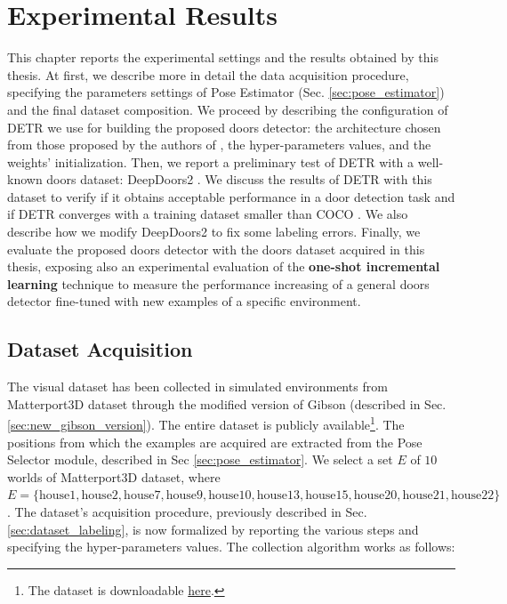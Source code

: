 \chapter{Experimental Results}
\label{sec:chapter5}
\thispagestyle{empty}

This chapter reports the experimental settings and the results obtained by this thesis. At first, we describe more in detail the data acquisition procedure, specifying the parameters settings of Pose Estimator (Sec. \ref{sec:pose_estimator}) and the final dataset composition. We proceed by describing the configuration of DETR we use for building the proposed doors detector: the architecture chosen from those proposed by the authors of \cite{detr}, the hyper-parameters values, and the weights' initialization. Then, we report a preliminary test of DETR with a well-known doors dataset: DeepDoors2 \cite{deepdoors2}. We discuss the results of DETR with this dataset to verify if it obtains acceptable performance in a door detection task and if DETR converges with a training dataset smaller than COCO \cite{coco}. We also describe how we modify DeepDoors2  to fix some labeling errors. Finally, we evaluate the proposed doors detector with the doors dataset acquired in this thesis, exposing also an experimental evaluation of the \textbf{one-shot incremental learning} technique to measure the performance increasing of a general doors detector fine-tuned with new examples of a specific environment. 

\section{Dataset Acquisition}
\label{sec:dataset_acquisition}
The visual dataset has been collected in simulated environments from Matterport3D dataset \cite{matterport} through the modified version of Gibson \cite{gibson} (described in Sec. \ref{sec:new_gibson_version}). The entire dataset is publicly available\footnote{The dataset is downloadable \href{https://drive.google.com/file/d/1BqjBpobjKTomFjDkzhWjmCryAXOEluO2/view?usp=sharing}{here}.}. The positions from which the examples are acquired are extracted from the Pose Selector module, described in Sec \ref{sec:pose_estimator}. We select a set $E$ of $10$ worlds of Matterport3D dataset, where $E = \{\text{house1}, \text{house2}, \text{house7}, \text{house9}, \text{house10}, \text{house13}, \text{house15}, \text{house20},  \text{house21},  \text{house22}\}$. The dataset's acquisition procedure, previously described in Sec. \ref{sec:dataset_labeling}, is now formalized by reporting the various steps and specifying the hyper-parameters values. The collection algorithm works as follows:


